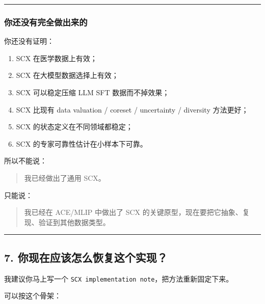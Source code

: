 \documentclass[
  12pt,
]{ctexart}
\providecommand{\tightlist}{%
  \setlength{\itemsep}{0pt}\setlength{\parskip}{0pt}}
\begin{document}
\begin{center}\rule{0.5\linewidth}{0.5pt}\end{center}

\subsubsection{你还没有完全做出来的}\label{ux4f60ux8fd8ux6ca1ux6709ux5b8cux5168ux505aux51faux6765ux7684}

你还没有证明：

\begin{enumerate}
\def\labelenumi{\arabic{enumi}.}
\tightlist
\item
  SCX 在医学数据上有效；
\item
  SCX 在大模型数据选择上有效；
\item
  SCX 可以稳定压缩 LLM SFT 数据而不掉效果；
\item
  SCX 比现有 data valuation / coreset / uncertainty / diversity
  方法更好；
\item
  SCX 的状态定义在不同领域都稳定；
\item
  SCX 的专家可靠性估计在小样本下可靠。
\end{enumerate}

所以不能说：

\begin{quote}
我已经做出了通用 SCX。
\end{quote}

只能说：

\begin{quote}
我已经在 ACE/MLIP 中做出了 SCX
的关键原型，现在要把它抽象、复现、验证到其他数据类型。
\end{quote}

\begin{center}\rule{0.5\linewidth}{0.5pt}\end{center}

\subsection{7.
你现在应该怎么恢复这个实现？}\label{ux4f60ux73b0ux5728ux5e94ux8be5ux600eux4e48ux6062ux590dux8fd9ux4e2aux5b9eux73b0}

我建议你马上写一个
\texttt{SCX\ implementation\ note}，把方法重新固定下来。

可以按这个骨架：
\end{document}
